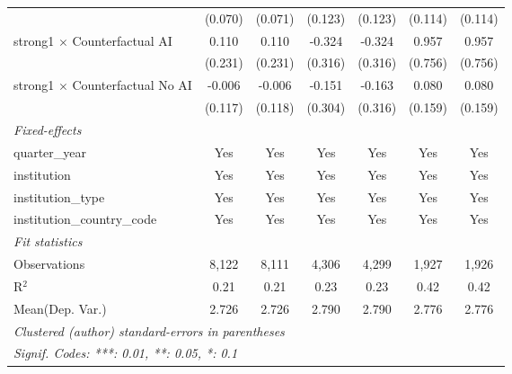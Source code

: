 \begin{tabular}{lcccccc}
                                          & (0.070)       & (0.071)       & (0.123)      & (0.123)      & (0.114)      & (0.114)\\   
   strong1 $\times$ Counterfactual AI     & 0.110         & 0.110         & -0.324       & -0.324       & 0.957        & 0.957\\   
                                          & (0.231)       & (0.231)       & (0.316)      & (0.316)      & (0.756)      & (0.756)\\   
   strong1 $\times$ Counterfactual No AI  & -0.006        & -0.006        & -0.151       & -0.163       & 0.080        & 0.080\\   
                                          & (0.117)       & (0.118)       & (0.304)      & (0.316)      & (0.159)      & (0.159)\\   
   \midrule
   \emph{Fixed-effects}\\
   quarter\_year                          & Yes           & Yes           & Yes          & Yes          & Yes          & Yes\\  
   institution                            & Yes           & Yes           & Yes          & Yes          & Yes          & Yes\\  
   institution\_type                      & Yes           & Yes           & Yes          & Yes          & Yes          & Yes\\  
   institution\_country\_code             & Yes           & Yes           & Yes          & Yes          & Yes          & Yes\\  
   \midrule
   \emph{Fit statistics}\\
   Observations                           & 8,122         & 8,111         & 4,306        & 4,299        & 1,927        & 1,926\\  
   R$^2$                                  & 0.21          & 0.21          & 0.23         & 0.23         & 0.42         & 0.42\\  
Mean(Dep. Var.) & 2.726 & 2.726 & 2.790 & 2.790 & 2.776 & 2.776 \\
   \midrule \midrule
   \multicolumn{7}{l}{\emph{Clustered (author) standard-errors in parentheses}}\\
   \multicolumn{7}{l}{\emph{Signif. Codes: ***: 0.01, **: 0.05, *: 0.1}}\\
\end{tabular}
\par\endgroup
